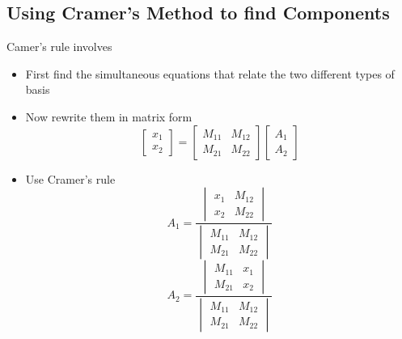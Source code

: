 \subsection{Using Cramer's Method to find Components}
Camer's rule involves
\begin{itemize}
	\item First find the simultaneous equations  that relate the two different types of basis
	\item  Now rewrite them in matrix form\\
	\begin{equation}
	\begin{bmatrix}
	x_{1}\\
	x_{2}
	\end{bmatrix} = 
	\begin{bmatrix}
	M_{11} & M_{12} \\
	M_{21} & M_{22}
	\end{bmatrix} \begin{bmatrix}
	A_{1} \\
	A_{2}
	\end{bmatrix}
	\end{equation}
	\item Use Cramer's rule \\
	\begin{equation}
	A_{1} = \frac{\begin{vmatrix}
		x_{1} & M_{12}\\
		x_{2} & M_{22}
		\end{vmatrix}}{\begin{vmatrix}
		M_{11} & M_{12} \\
		M_{21} & M_{22}
		\end{vmatrix}}
	\end{equation}
	\begin{equation}
	A_{2} = \frac{\begin{vmatrix}
		M_{11} & x_{1}\\
		M_{21} & x_{2}
		\end{vmatrix}}{\begin{vmatrix}
		M_{11} & M_{12} \\
		M_{21} & M_{22}
		\end{vmatrix}}
	\end{equation}
\end{itemize}


